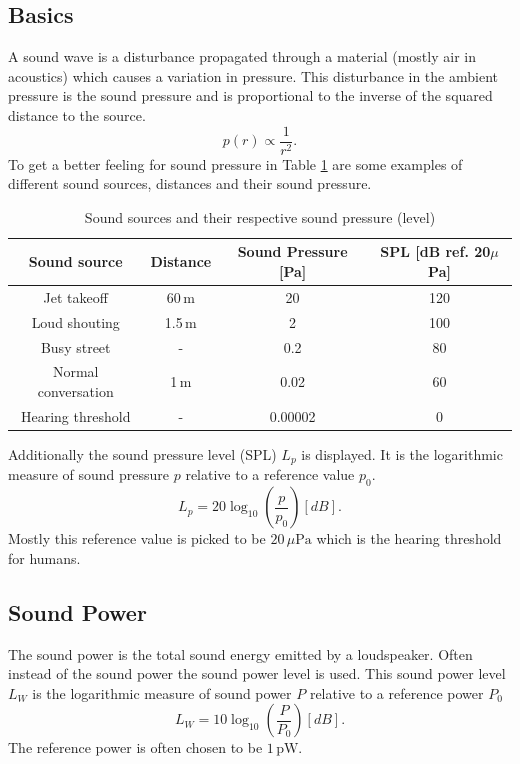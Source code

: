 \subsection{Basics}
A sound wave is a disturbance propagated through  a material (mostly air in acoustics) which causes a variation in pressure.
This disturbance in the ambient pressure is the sound pressure and is proportional to the inverse of the squared distance to the source.\cite{BERANEK20121}
\begin{equation}\label{2_Acoustics_eq:Pressure_sphere}
    p(r) \propto \frac{1}{r^2}.
\end{equation}
To get a better feeling for sound pressure in Table \ref{2_Acoustics_tab:Sound_pressure_level} are some examples of different sound sources, distances and their sound pressure. \cite{rossing1990science}
\begin{center}
\begin{table}[h!]
    \centering
    \begin{tabular}{| c | c | c | c |} 
     \hline 
     Sound source & Distance & Sound Pressure [Pa] & SPL [dB ref. 20$\mu$Pa] \\ 
     \hline
     Jet takeoff & 60$\,$m & 20 & 120 \\  
     Loud shouting & 1.5$\,$m & 2 & 100 \\
     Busy street & - & 0.2 & 80 \\
     Normal conversation & 1$\,$m & 0.02 & 60 \\
     Hearing threshold & - & 0.00002 & 0 \\
      \hline
    \end{tabular}
    \caption{Sound sources and their respective sound pressure (level)}
    \label{2_Acoustics_tab:Sound_pressure_level}
\end{table}
\end{center}
Additionally the sound pressure level (SPL) $L_p$ is displayed. It is the logarithmic measure of sound pressure $p$ relative to a reference value $p_0$.
\begin{equation}
    L_p 
    =
    20 \log_{10} \left ( \frac{p}{p_0} \right ) [dB].
\end{equation}
Mostly this reference value is picked to be $20 \, \mu\text{Pa}$ which is the hearing threshold for humans. \cite{rossing1990science}
\subsection{Sound Power}
The sound power is the total sound energy emitted by a loudspeaker. Often instead of the sound power the sound power level is used. This sound power level $L_W$ is the logarithmic measure of sound power $P$ relative to a reference power $P_0$
\begin{equation}
    L_W = 10\log_{10} \left (  \frac{P}{P_0} \right ) [dB].
\end{equation}
The reference power is often chosen to be $1 \, \text{pW}$. \cite{rossing1990science}

